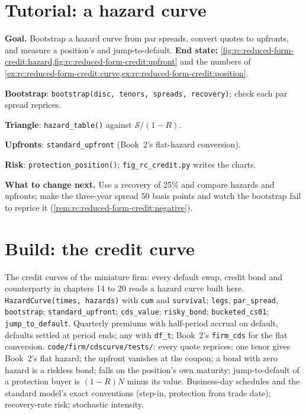 \section{Tutorial: a hazard curve}\label{tut:rc:reduced-form-credit:tutorial}

\begin{tutorial}
\textbf{Goal.} Bootstrap a hazard curve from par spreads, convert quotes to upfronts, and
measure a position's  and jump-to-default. \textbf{End state:}
\cref{fig:rc:reduced-form-credit:hazard,fig:rc:reduced-form-credit:upfront} and the
numbers of \cref{ex:rc:reduced-form-credit:curve,ex:rc:reduced-form-credit:position}.
\begin{tutsteps}
\item \textbf{Bootstrap}: \texttt{bootstrap(disc, tenors, spreads, recovery)}; check each
par spread reprices.
\item \textbf{Triangle}: \texttt{hazard\_table()} against $\mathcal S/(1-R)$.
\item \textbf{Upfronts}: \texttt{standard\_upfront} (Book~2's flat-hazard conversion).
\item \textbf{Risk}: \texttt{protection\_position()}; \texttt{fig\_rc\_credit.py} writes the
charts.
\end{tutsteps}
\textbf{What to change next.} Use a recovery of 25\% and compare hazards and upfronts;
make the three-year spread 50 basis points and watch the bootstrap fail to reprice it
(\cref{rem:rc:reduced-form-credit:negative}).
\end{tutorial}

\section{Build: the credit curve}\label{bld:rc:reduced-form-credit:cdscurve}

\begin{build}
 The credit curves of the miniature firm: every default swap, credit
bond and counterparty in chapters 14 to 20 reads a hazard curve built here.
 \texttt{HazardCurve(times, hazards)} with \texttt{cum} and
\texttt{survival}; \texttt{legs}, \texttt{par\_spread}, \texttt{bootstrap};
\texttt{standard\_upfront}; \texttt{cds\_value}; \texttt{risky\_bond};
\texttt{bucketed\_cs01}; \texttt{jump\_to\_default}.
 Quarterly premiums with half-period accrual on default, defaults settled at
period ends; any  with \texttt{df\_t}; Book~2's \texttt{firm\_cds} for the
flat conversion.
 \texttt{code/firm/cdscurve/tests/}: every quote reprices; one
tenor gives Book~2's flat hazard; the upfront vanishes at the coupon; a bond with zero
hazard is a riskless bond;  falls on the position's own maturity; jump-to-default of
a protection buyer is $(1-R)N$ minus its value.
 Business-day schedules and the standard model's exact conventions
(step-in, protection from trade date); recovery-rate risk; stochastic intensity.
\end{build}

